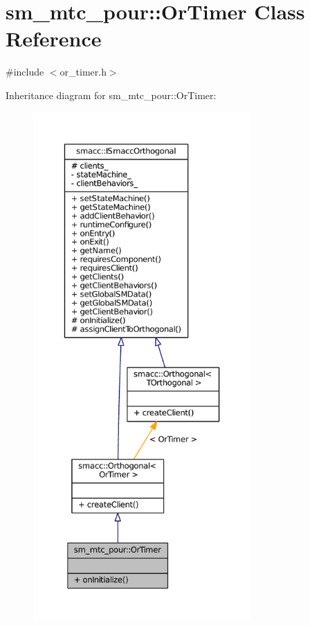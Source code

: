 \hypertarget{classsm__mtc__pour_1_1OrTimer}{}\section{sm\+\_\+mtc\+\_\+pour\+:\+:Or\+Timer Class Reference}
\label{classsm__mtc__pour_1_1OrTimer}


{\ttfamily \#include $<$or\+\_\+timer.\+h$>$}



Inheritance diagram for sm\+\_\+mtc\+\_\+pour\+:\+:Or\+Timer\+:
\nopagebreak
\begin{figure}[H]
\begin{center}
\leavevmode
\includegraphics[height=550pt]{classsm__mtc__pour_1_1OrTimer__inherit__graph}
\end{center}
\end{figure}



